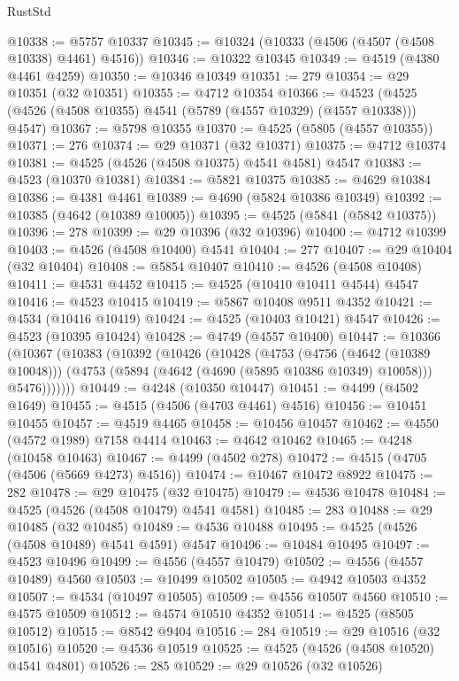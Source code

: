 \begin{lexlean}{RustStd}
\begin{coremodule}
{\begin{coremodule}
{{{{{{{{{{{{{{{{{{{{{{{{{{{{{{{{{{{{{{{{{{{{{{{{{{{{{{{@10338 := @5757 @10337
@10345 := @10324 (@10333 (@4506 (@4507 (@4508 @10338) @4461) @4516))
@10346 := @10322 @10345
@10349 := @4519 (@4380 @4461 @4259)
@10350 := @10346 @10349
@10351 := 279
@10354 := @29 @10351 (@32 @10351)
@10355 := @4712 @10354
@10366 := @4523 (@4525 (@4526 (@4508 @10355) @4541 (@5789 (@4557 @10329) (@4557 @10338))) @4547)
@10367 := @5798 @10355
@10370 := @4525 (@5805 (@4557 @10355))
@10371 := 276
@10374 := @29 @10371 (@32 @10371)
@10375 := @4712 @10374
@10381 := @4525 (@4526 (@4508 @10375) @4541 @4581) @4547
@10383 := @4523 (@10370 @10381)
@10384 := @5821 @10375
@10385 := @4629 @10384
@10386 := @4381 @4461
@10389 := @4690 (@5824 @10386 @10349)
@10392 := @10385 (@4642 (@10389 @10005))
@10395 := @4525 (@5841 (@5842 @10375))
@10396 := 278
@10399 := @29 @10396 (@32 @10396)
@10400 := @4712 @10399
@10403 := @4526 (@4508 @10400) @4541
@10404 := 277
@10407 := @29 @10404 (@32 @10404)
@10408 := @5854 @10407
@10410 := @4526 (@4508 @10408)
@10411 := @4531 @4452
@10415 := @4525 (@10410 @10411 @4544) @4547
@10416 := @4523 @10415
@10419 := @5867 @10408 @9511 @4352
@10421 := @4534 (@10416 @10419)
@10424 := @4525 (@10403 @10421) @4547
@10426 := @4523 (@10395 @10424)
@10428 := @4749 (@4557 @10400)
@10447 := @10366
    (@10367
      (@10383
        (@10392
          (@10426
            (@10428
              (@4753
                (@4756 (@4642 (@10389 @10048)))
                (@4753 (@5894 (@4642 (@4690 (@5895 @10386 @10349) @10058))) @5476)))))))
@10449 := @4248 (@10350 @10447)
@10451 := @4499 (@4502 @1649)
@10455 := @4515 (@4506 (@4703 @4461) @4516)
@10456 := @10451 @10455
@10457 := @4519 @4465
@10458 := @10456 @10457
@10462 := @4550 (@4572 @1989) @7158 @4414
@10463 := @4642 @10462
@10465 := @4248 (@10458 @10463)
@10467 := @4499 (@4502 @278)
@10472 := @4515 (@4705 (@4506 (@5669 @4273) @4516))
@10474 := @10467 @10472 @8922
@10475 := 282
@10478 := @29 @10475 (@32 @10475)
@10479 := @4536 @10478
@10484 := @4525 (@4526 (@4508 @10479) @4541 @4581)
@10485 := 283
@10488 := @29 @10485 (@32 @10485)
@10489 := @4536 @10488
@10495 := @4525 (@4526 (@4508 @10489) @4541 @4591) @4547
@10496 := @10484 @10495
@10497 := @4523 @10496
@10499 := @4556 (@4557 @10479)
@10502 := @4556 (@4557 @10489) @4560
@10503 := @10499 @10502
@10505 := @4942 @10503 @4352
@10507 := @4534 (@10497 @10505)
@10509 := @4556 @10507 @4560
@10510 := @4575 @10509
@10512 := @4574 @10510 @4352
@10514 := @4525 (@8505 @10512)
@10515 := @8542 @9404
@10516 := 284
@10519 := @29 @10516 (@32 @10516)
@10520 := @4536 @10519
@10525 := @4525 (@4526 (@4508 @10520) @4541 @4801)
@10526 := 285
@10529 := @29 @10526 (@32 @10526)
}}}}}}}}}}}}}}}}}}}}}}}}}}}}}}}}}}}}}}}}}}}}}}}}}}}}}}}
\end{coremodule}}
\end{coremodule}
\end{lexlean}
